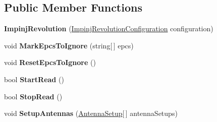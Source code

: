 \subsection*{Public Member Functions}
\begin{DoxyCompactItemize}
\item 
{\bfseries Impinj\+Revolution} (\hyperlink{class_portais_1_1_driver_1_1_impinj_revolution_1_1_impinj_revolution_configuration}{Impinj\+Revolution\+Configuration} configuration)\hypertarget{class_portais_1_1_driver_1_1_impinj_revolution_1_1_impinj_revolution_a3e1fa2c8ed9e2fcf3d3197ac077dc0b4}{}\label{class_portais_1_1_driver_1_1_impinj_revolution_1_1_impinj_revolution_a3e1fa2c8ed9e2fcf3d3197ac077dc0b4}

\item 
void {\bfseries Mark\+Epcs\+To\+Ignore} (string\mbox{[}$\,$\mbox{]} epcs)\hypertarget{class_portais_1_1_driver_1_1_impinj_revolution_1_1_impinj_revolution_a94da09e0cf1deaba538ec7d77e77798e}{}\label{class_portais_1_1_driver_1_1_impinj_revolution_1_1_impinj_revolution_a94da09e0cf1deaba538ec7d77e77798e}

\item 
void {\bfseries Reset\+Epcs\+To\+Ignore} ()\hypertarget{class_portais_1_1_driver_1_1_impinj_revolution_1_1_impinj_revolution_a30158faa078d3bb12bd75a8fcde7397e}{}\label{class_portais_1_1_driver_1_1_impinj_revolution_1_1_impinj_revolution_a30158faa078d3bb12bd75a8fcde7397e}

\item 
bool {\bfseries Start\+Read} ()\hypertarget{class_portais_1_1_driver_1_1_impinj_revolution_1_1_impinj_revolution_a98e57ba8ffbd0aa95b866c3e4f9054dd}{}\label{class_portais_1_1_driver_1_1_impinj_revolution_1_1_impinj_revolution_a98e57ba8ffbd0aa95b866c3e4f9054dd}

\item 
bool {\bfseries Stop\+Read} ()\hypertarget{class_portais_1_1_driver_1_1_impinj_revolution_1_1_impinj_revolution_a3e802bbe192720ba5c705e1017200db3}{}\label{class_portais_1_1_driver_1_1_impinj_revolution_1_1_impinj_revolution_a3e802bbe192720ba5c705e1017200db3}

\item 
void {\bfseries Setup\+Antennas} (\hyperlink{class_portais_1_1_driver_1_1_antenna_setup}{Antenna\+Setup}\mbox{[}$\,$\mbox{]} antenna\+Setups)\hypertarget{class_portais_1_1_driver_1_1_impinj_revolution_1_1_impinj_revolution_aeafd27ab7c3087b90374ae63e524bcbf}{}\label{class_portais_1_1_driver_1_1_impinj_revolution_1_1_impinj_revolution_aeafd27ab7c3087b90374ae63e524bcbf}


\end{DoxyCompactItemize}
